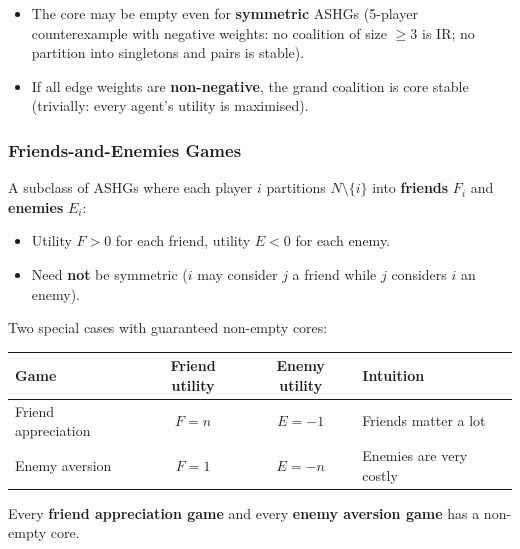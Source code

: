 \begin{thmbox}
\begin{itemize}
  \item The core may be empty even for \textbf{symmetric} ASHGs (5-player counterexample with negative weights: no coalition of size $\geq 3$ is IR; no partition into singletons and pairs is stable).
  \item If all edge weights are \textbf{non-negative}, the grand coalition is core stable (trivially: every agent's utility is maximised).
\end{itemize}
\end{thmbox}

\separator

\subsubsection{Friends-and-Enemies Games}

\begin{defbox}
A subclass of ASHGs where each player $i$ partitions $N \setminus \{i\}$ into \textbf{friends} $F_i$ and \textbf{enemies} $E_i$:
\begin{itemize}
  \item Utility $F > 0$ for each friend, utility $E < 0$ for each enemy.
  \item Need \textbf{not} be symmetric ($i$ may consider $j$ a friend while $j$ considers $i$ an enemy).
\end{itemize}

Two special cases with guaranteed non-empty cores:
\begin{center}
\renewcommand{\arraystretch}{1.3}
\begin{tabular}{@{} l c c l @{}}
\toprule
\textbf{Game} & \textbf{Friend utility} & \textbf{Enemy utility} & \textbf{Intuition} \\
\midrule
Friend appreciation & $F = n$ & $E = -1$ & Friends matter a lot \\
Enemy aversion & $F = 1$ & $E = -n$ & Enemies are very costly \\
\bottomrule
\end{tabular}
\end{center}
\end{defbox}

\begin{thmbox}
Every \textbf{friend appreciation game} and every \textbf{enemy aversion game} has a non-empty core.
\end{thmbox}

